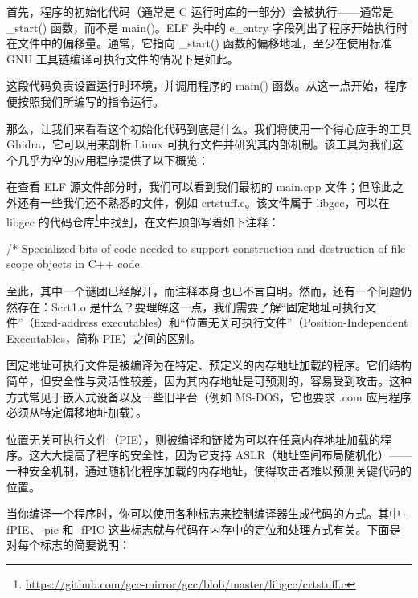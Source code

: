 首先，程序的初始化代码（通常是 C 运行时库的一部分）会被执行——通常是 \_start() 函数，而不是 main()。ELF 头中的 e\_entry 字段列出了程序开始执行时在文件中的偏移量。通常，它指向 \_start() 函数的偏移地址，至少在使用标准 GNU 工具链编译可执行文件的情况下是如此。

这段代码负责设置运行时环境，并调用程序的 main() 函数。从这一点开始，程序便按照我们所编写的指令运行。

那么，让我们来看看这个初始化代码到底是什么。我们将使用一个得心应手的工具 Ghidra，它可以用来剖析 Linux 可执行文件并研究其内部机制。该工具为我们这个几乎为空的应用程序提供了以下概览：


在查看 ELF 源文件部分时，我们可以看到我们最初的 main.cpp 文件；但除此之外还有一些我们还不熟悉的文件，例如 crtstuff.c。该文件属于 libgcc，可以在 libgcc 的代码仓库\footnote{\url{https://github.com/gcc-mirror/gcc/blob/master/libgcc/crtstuff.c}}中找到，在文件顶部写着如下注释：

\begin{cpp}
/* Specialized bits of code needed to support construction and destruction of file-scope objects in C++ code.
\end{cpp}

至此，其中一个谜团已经解开，而注释本身也已不言自明。然而，还有一个问题仍然存在：Scrt1.o 是什么？要理解这一点，我们需要了解“固定地址可执行文件”（fixed-address executables）和“位置无关可执行文件”（Position-Independent Executables，简称 PIE）之间的区别。

固定地址可执行文件是被编译为在特定、预定义的内存地址加载的程序。它们结构简单，但安全性与灵活性较差，因为其内存地址是可预测的，容易受到攻击。这种方式常见于嵌入式设备以及一些旧平台（例如 MS-DOS，它也要求 .com 应用程序必须从特定偏移地址加载）。

位置无关可执行文件（PIE），则被编译和链接为可以在任意内存地址加载的程序。这大大提高了程序的安全性，因为它支持 ASLR（地址空间布局随机化）——一种安全机制，通过随机化程序加载的内存地址，使得攻击者难以预测关键代码的位置。

当你编译一个程序时，你可以使用各种标志来控制编译器生成代码的方式。其中 -fPIE、-pie 和 -fPIC 这些标志就与代码在内存中的定位和处理方式有关。下面是对每个标志的简要说明：

